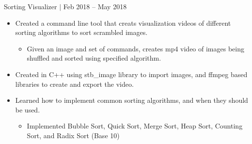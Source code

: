 \documentclass[12pt]{article}
\newcommand{\projText}[2]{\noindent#1 $|$ {\color{textGray} #2}}
\begin{document}
    \medskip %

    \projText{Sorting Visualizer}{Feb 2018 -- May 2018}
    \begin{small}
        \begin{itemize}
            \item {\color{textGray} Created a command line tool that creats visualization videos of different sorting algorithms to sort scrambled images.}
                \begin{itemize}[label=$\circ$]
                    \item {\color{textGray} Given an image and set of commands, creates mp4 video of images being shuffled and sorted using specified algorithm.}
                \end{itemize}
            \item {\color{textGray} Created in C++ using stb\_image library to import images, and ffmpeg based libraries to create and export the video.}
            \item {\color{textGray} Learned how to implement common sorting algorithms, and when they should be used.}
                \begin{itemize}[label=$\circ$]
                    \item {\color{textGray} Implemented Bubble Sort, Quick Sort, Merge Sort, Heap Sort, Counting Sort, and Radix Sort (Base 10)}
                \end{itemize}
        \end{itemize}
    \end{small}
\end{document}
